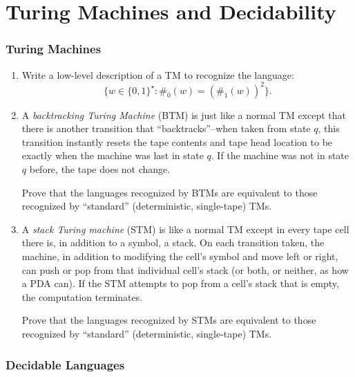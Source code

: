 \part{Turing Machines and Decidability}

\section{Turing Machines}

\begin{enumerate}[resume]
	\item {} Write a low-level description of a TM to recognize the language:
	\[
	\{w \in \{0, 1\}^\star : \#_0(w) = (\#_1(w))^2 \}.
	\]
	
	\item {} A \emph{backtracking Turing Machine} (BTM) is just like a normal TM except that there is another transition that ``backtracks''--when taken from state $q$, this transition instantly resets the tape contents and tape head location to be exactly when the machine was last in state $q$. If the machine was not in state $q$ before, the tape does not change.
	
	Prove that the languages recognized by BTMs are equivalent to those recognized by ``standard'' (deterministic, single-tape) TMs.
	
	\item {} A \emph{stack Turing machine} (STM) is like a normal TM except in every tape cell there is, in addition to a symbol, a stack. On each transition taken, the machine, in addition to modifying the cell's symbol and move left or right, can push or pop from that individual cell's stack (or both, or neither, as how a PDA can). If the STM attempts to pop from a cell's stack that is empty, the computation terminates.
	
	Prove that the languages recognized by STMs are equivalent to those recognized by ``standard'' (deterministic, single-tape) TMs.
	
\end{enumerate}

\section{Decidable Languages}

